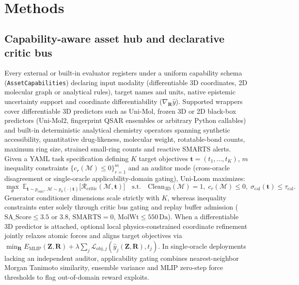 \documentclass[11pt,a4paper]{article}
\begin{document}
\section*{Methods}

\subsection*{Capability-aware asset hub and declarative critic bus}

Every external or built-in evaluator registers under a uniform capability schema (\texttt{AssetCapabilities}) declaring input modality (differentiable 3D coordinates, 2D molecular graph or analytical rules), target names and units, native epistemic uncertainty support and coordinate differentiability ($\nabla_{\mathbf{R}}\hat{y}$). Supported wrappers cover differentiable 3D predictors such as Uni-Mol\cite{zhou2023unimol}, frozen 3D or 2D black-box predictors (Uni-Mol2\cite{ji2024unimol2}, fingerprint QSAR ensembles or arbitrary Python callables) and built-in deterministic analytical chemistry operators spanning synthetic accessibility\cite{ertl2009sa}, quantitative drug-likeness\cite{bickerton2012qed}, molecular weight, rotatable-bond counts, maximum ring size, strained small-ring counts and reactive SMARTS alerts. Given a YAML task specification defining $K$ target objectives $\mathbf{t} = (t_1,\dots,t_K)$, $m$ inequality constraints $\{c_r(\mathcal{M})\le 0\}_{r=1}^m$ and an auditor mode (cross-oracle disagreement or single-oracle applicability-domain gating), Uni-Loom maximizes:
\begin{equation}
\max_{\theta}\;\mathbb{E}_{\mathbf{t}\sim p_{\text{curr}},\,\mathcal{M}\sim p_\theta(\cdot\mid\mathbf{t})}\!\big[\mathcal{R}_{\text{critic}}(\mathcal{M},\mathbf{t})\big]
\quad\text{s.t.}\quad \text{Clean}_{3\text{D}}(\mathcal{M})=1,\; c_r(\mathcal{M})\le 0,\; \sigma_{\text{cal}}(\mathbf{t})\le \tau_{\text{cal}}.
\end{equation}
Generator conditioner dimensions scale strictly with $K$, whereas inequality constraints enter solely through critic bus gating and replay buffer admission ($\text{SA\_Score}\le 3.5$ or $3.8$, $\text{SMARTS}=0$, $\text{MolWt}\le 550\,\text{Da}$). When a differentiable 3D predictor is attached, optional local physics-constrained coordinate refinement jointly relaxes atomic forces and aligns target objectives via $\min_{\mathbf{R}} E_{\text{MLIP}}(\mathbf{Z},\mathbf{R}) + \lambda \sum_j \mathcal{L}_{\text{obj},j}(\hat{y}_j(\mathbf{Z},\mathbf{R}), t_j)$. In single-oracle deployments lacking an independent auditor, applicability gating combines nearest-neighbor Morgan Tanimoto similarity, ensemble variance and MLIP zero-step force thresholds to flag out-of-domain reward exploits.
\end{document}
